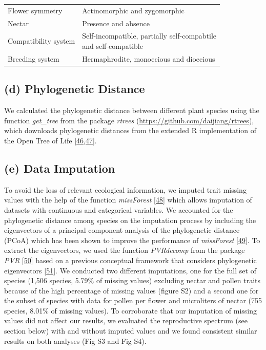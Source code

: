 \documentclass[
  12pt,
  a4paper,
]{article}
\begin{document}
\begin{table}
\begin{tabular}[t]{ll}
\hspace{1em}Flower symmetry & Actinomorphic and zygomorphic\\
\hspace{1em}Nectar & Presence and absence\\
\hspace{1em}Compatibility system & \makecell[l]{Self-incompatible, partially self-compabtile \\ and self-compatible}\\
\hspace{1em}Breeding system & Hermaphrodite, monoecious and dioecious\\
\bottomrule
\end{tabular}
\end{table}

\doublespacing

\hypertarget{d-phylogenetic-distance}{%
\subsection{(d) Phylogenetic Distance}\label{d-phylogenetic-distance}}

We calculated the phylogenetic distance between different plant species using the function \emph{get\_tree} from the package \emph{rtrees} (\url{https://github.com/daijiang/rtrees}), which downloads phylogenetic distances from the extended R implementation of the Open Tree of Life {[}\protect\hyperlink{ref-smith2018}{46},\protect\hyperlink{ref-jin2019}{47}{]}.

\hypertarget{e-data-imputation}{%
\subsection{(e) Data Imputation}\label{e-data-imputation}}

To avoid the loss of relevant ecological information, we imputed trait missing values with the help of the function \emph{missForest} {[}\protect\hyperlink{ref-stekhoven2012}{48}{]} which allows imputation of datasets with continuous and categorical variables. We accounted for the phylogenetic distance among species on the imputation process by including the eigenvectors of a principal component analysis of the phylogenetic distance (PCoA) which has been shown to improve the performance of \emph{missForest} {[}\protect\hyperlink{ref-penone2014}{49}{]}. To extract the eigenvectors, we used the function \emph{PVRdecomp} from the package \emph{PVR} {[}\protect\hyperlink{ref-santos2018}{50}{]} based on a previous conceptual framework that considers phylogenetic eigenvectors {[}\protect\hyperlink{ref-diniz-filho2012}{51}{]}. We conducted two different imputations, one for the full set of species (1,506 species, 5.79\% of missing values) excluding nectar and pollen traits because of the high percentage of missing values (figure S2) and a second one for the subset of species with data for pollen per flower and microliters of nectar (755 species, 8.01\% of missing values). To corroborate that our imputation of missing values did not affect our results, we evaluated the reproductive spectrum (see section below) with and without imputed values and we found consistent similar results on both analyses (Fig S3 and Fig S4).
\end{document}
